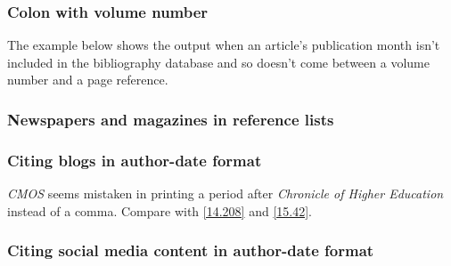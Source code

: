 \documentclass[11pt,letterpaper,oneside]{article}
\begin{document}
\subsubsection{Colon with volume number}

The example below shows the output when an article's publication month
isn't included in the bibliography database and so doesn't come
between a volume number and a page reference.

\begin{citeref}
\item \parencite{gunderson2015}
\end{citeref}

\subsubsection{Newspapers and magazines in reference lists}

\begin{citeref}
\item \parencite{nytimes2002}
\end{citeref}

\setcounter{subsubsection}{50}
\subsubsection{Citing blogs in author-date format}
\label{15.51}

\textit{CMOS} seems mistaken in printing a period after
\textit{Chronicle of Higher Education} instead of a comma. Compare
with \ref{14.208} and \ref{15.42}.

\begin{citeref}
\item \parencite{germano2017}
\end{citeref}

\subsubsection{Citing social media content in author-date format}
\label{15.52}

\begin{citeref}
\item \parencite{diaz2016}
\item \parencite{obrien2015}
\item \parencite{chicago2015}
\end{citeref}
\end{document}
